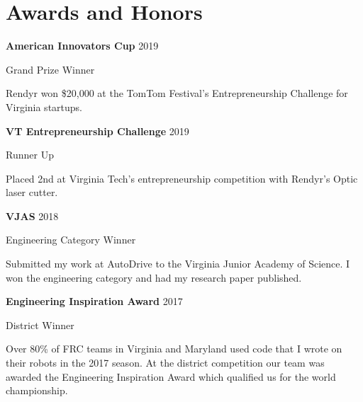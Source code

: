 \section{Awards and Honors}
\begin{small}
	
\parbox[t][][t]{\linewidth}{
	\parbox{\linewidth}{\textbf{American Innovators Cup} \hfill {{2019}}}
	\parbox{\linewidth}{Grand Prize Winner}
	\smallbreak
	\smallskip
	Rendyr won \$20,000 at the TomTom Festival's Entrepreneurship Challenge for Virginia startups.
	\bigbreak
	\smallskip
}

\parbox[t][][t]{\linewidth}{
	\parbox{\linewidth}{\textbf{VT Entrepreneurship Challenge} \hfill {{2019}}}
	\parbox{\linewidth}{Runner Up}
	\smallbreak
	\smallskip
	Placed 2nd at Virginia Tech's entrepreneurship competition with Rendyr's Optic laser cutter.
	\bigbreak
	\smallskip
}

\parbox[t][][t]{\linewidth}{
	\parbox{\linewidth}{\textbf{VJAS} \hfill {{2018}}}
	\parbox{\linewidth}{Engineering Category Winner}
	\smallbreak
	\smallskip
	Submitted my work at AutoDrive to the Virginia Junior Academy of Science. I won the engineering category and had my research paper published.
	\bigbreak
	\smallskip
}

\parbox[t][][t]{\linewidth}{
	\parbox{\linewidth}{\textbf{Engineering Inspiration Award} \hfill {{2017}}}
	\parbox{\linewidth}{District Winner}
	\smallbreak
	\smallskip
	Over 80\% of FRC teams in Virginia and Maryland used code that I wrote on their robots in the 2017 season. At the district competition our team was awarded the Engineering Inspiration Award which qualified us for the world championship.
	\bigbreak
	\smallskip
}

\end{small}